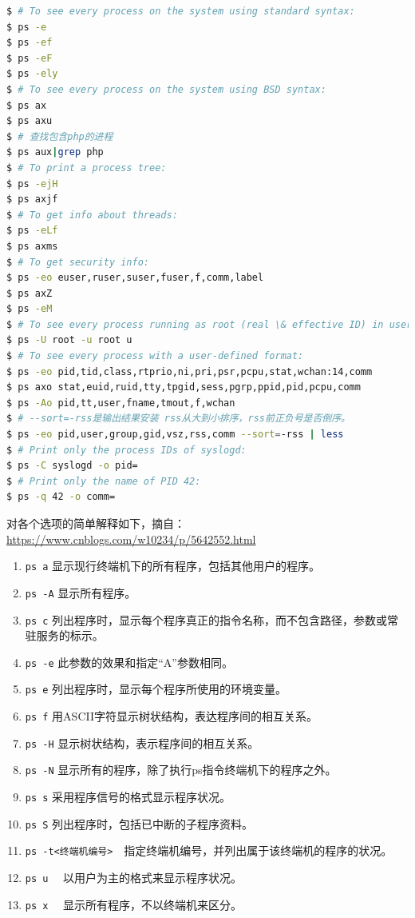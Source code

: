 \documentclass[doctor,openright,twoside]{sjtuthesis}
\providecommand{\tightlist}{%
    \setlength{\itemsep}{0pt}\setlength{\parskip}{0pt}}
\newcommand{\passthrough}[1]{#1}
\theoremstyle{plain}
\theoremstyle{definition}
\theoremstyle{remark}
\theoremstyle{ocrenumbox}
\theoremstyle{plain}
\begin{document}
\begin{lstlisting}[language=bash]
$ # To see every process on the system using standard syntax:
$ ps -e
$ ps -ef
$ ps -eF
$ ps -ely
$ # To see every process on the system using BSD syntax:
$ ps ax
$ ps axu
$ # 查找包含php的进程
$ ps aux|grep php
$ # To print a process tree:
$ ps -ejH
$ ps axjf
$ # To get info about threads:
$ ps -eLf
$ ps axms
$ # To get security info:
$ ps -eo euser,ruser,suser,fuser,f,comm,label
$ ps axZ
$ ps -eM
$ # To see every process running as root (real \& effective ID) in user format:
$ ps -U root -u root u
$ # To see every process with a user-defined format:
$ ps -eo pid,tid,class,rtprio,ni,pri,psr,pcpu,stat,wchan:14,comm
$ ps axo stat,euid,ruid,tty,tpgid,sess,pgrp,ppid,pid,pcpu,comm
$ ps -Ao pid,tt,user,fname,tmout,f,wchan
$ # --sort=-rss是输出结果安装 rss从大到小排序，rss前正负号是否倒序。
$ ps -eo pid,user,group,gid,vsz,rss,comm --sort=-rss | less
$ # Print only the process IDs of syslogd:
$ ps -C syslogd -o pid=
$ # Print only the name of PID 42:
$ ps -q 42 -o comm=
\end{lstlisting}

对各个选项的简单解释如下，摘自：\url{https://www.cnblogs.com/w10234/p/5642552.html}

\begin{enumerate}
\def\labelenumi{\arabic{enumi}.}
\tightlist
\item
  \passthrough{\lstinline!ps a!} 显示现行终端机下的所有程序，包括其他用户的程序。
\item
  \passthrough{\lstinline!ps -A!} 显示所有程序。
\item
  \passthrough{\lstinline!ps c!} 列出程序时，显示每个程序真正的指令名称，而不包含路径，参数或常驻服务的标示。
\item
  \passthrough{\lstinline!ps -e!} 此参数的效果和指定``A''参数相同。
\item
  \passthrough{\lstinline!ps e!} 列出程序时，显示每个程序所使用的环境变量。
\item
  \passthrough{\lstinline!ps f!} 用ASCII字符显示树状结构，表达程序间的相互关系。
\item
  \passthrough{\lstinline!ps -H!} 显示树状结构，表示程序间的相互关系。
\item
  \passthrough{\lstinline!ps -N!} 显示所有的程序，除了执行ps指令终端机下的程序之外。
\item
  \passthrough{\lstinline!ps s!} 采用程序信号的格式显示程序状况。
\item
  \passthrough{\lstinline!ps S!} 列出程序时，包括已中断的子程序资料。
\item
  \passthrough{\lstinline!ps -t<终端机编号>!}　指定终端机编号，并列出属于该终端机的程序的状况。
\item
  \passthrough{\lstinline!ps u!} 　以用户为主的格式来显示程序状况。
\item
  \passthrough{\lstinline!ps x!} 　显示所有程序，不以终端机来区分。
\end{enumerate}
\end{document}
